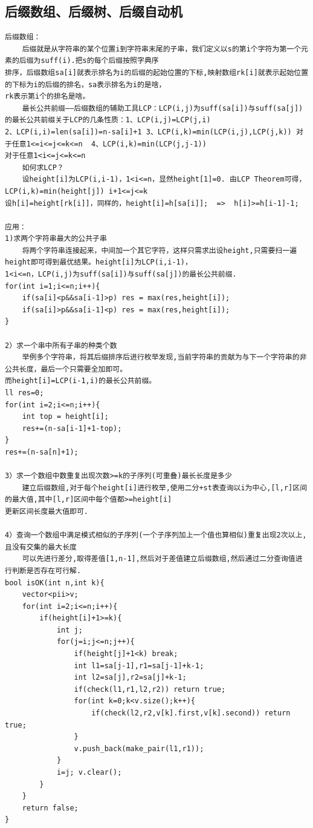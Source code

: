 \documentclass[twoside]{article}
\begin{document}
\subsection{后缀数组、后缀树、后缀自动机}
\begin{lstlisting}
后缀数组：
    后缀就是从字符串的某个位置i到字符串末尾的子串，我们定义以s的第i个字符为第一个元素的后缀为suff(i).把s的每个后缀按照字典序
排序，后缀数组sa[i]就表示排名为i的后缀的起始位置的下标,映射数组rk[i]就表示起始位置的下标为i的后缀的排名，sa表示排名为i的是啥，
rk表示第i个的排名是啥。
    最长公共前缀——后缀数组的辅助工具LCP：LCP(i,j)为suff(sa[i])与suff(sa[j])的最长公共前缀关于LCP的几条性质：1、LCP(i,j)=LCP(j,i) 
2、LCP(i,i)=len(sa[i])=n-sa[i]+1 3、LCP(i,k)=min(LCP(i,j),LCP(j,k)) 对于任意1<=i<=j<=k<=n  4、LCP(i,k)=min(LCP(j,j-1)) 
对于任意1<i<=j<=k<=n
    如何求LCP？
    设height[i]为LCP(i,i-1)，1<i<=n，显然height[1]=0. 由LCP Theorem可得，LCP(i,k)=min(height[j]) i+1<=j<=k
设h[i]=height[rk[i]]，同样的，height[i]=h[sa[i]];  =>  h[i]>=h[i-1]-1;

应用：
1)求两个字符串最大的公共子串
    将两个字符串连接起来，中间加一个其它字符，这样只需求出设height,只需要扫一遍height即可得到最优结果。height[i]为LCP(i,i-1)，
1<i<=n，LCP(i,j)为suff(sa[i])与suff(sa[j])的最长公共前缀.
for(int i=1;i<=n;i++){
    if(sa[i]<p&&sa[i-1]>p) res = max(res,height[i]);
    if(sa[i]>p&&sa[i-1]<p) res = max(res,height[i]);
}

2）求一个串中所有子串的种类个数
    举例多个字符串，将其后缀排序后进行枚举发现,当前字符串的贡献为与下一个字符串的非公共长度，最后一个只需要全加即可。
而height[i]=LCP(i-1,i)的最长公共前缀。
ll res=0;
for(int i=2;i<=n;i++){
    int top = height[i];
    res+=(n-sa[i-1]+1-top);
}
res+=(n-sa[n]+1);

3）求一个数组中数重复出现次数>=k的子序列(可重叠)最长长度是多少
    建立后缀数组,对于每个height[i]进行枚举,使用二分+st表查询以i为中心,[l,r]区间的最大值,其中[l,r]区间中每个值都>=height[i]
更新区间长度最大值即可.

4）查询一个数组中满足模式相似的子序列(一个子序列加上一个值也算相似)重复出现2次以上,且没有交集的最大长度
    可以先进行差分,取得差值[1,n-1],然后对于差值建立后缀数组,然后通过二分查询值进行判断是否存在可行解.
bool isOK(int n,int k){
    vector<pii>v;
    for(int i=2;i<=n;i++){
        if(height[i]+1>=k){
            int j;
            for(j=i;j<=n;j++){
                if(height[j]+1<k) break;
                int l1=sa[j-1],r1=sa[j-1]+k-1;
                int l2=sa[j],r2=sa[j]+k-1;
                if(check(l1,r1,l2,r2)) return true;
                for(int k=0;k<v.size();k++){
                    if(check(l2,r2,v[k].first,v[k].second)) return true;
                }
                v.push_back(make_pair(l1,r1));
            }
            i=j; v.clear();
        }
    }
    return false;
}


\end{lstlisting}
\end{document}
